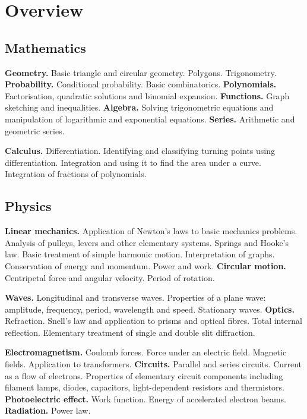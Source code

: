 \documentclass{article}
\date{x/x/20xx}
\begin{document}
\pagestyle{fancy}


\section{Overview}
\subsection{Mathematics}

\textbf{Geometry.} Basic triangle and circular geometry. Polygons. Trigonometry. \textbf{Probability.} Conditional probability. Basic combinatorics. \textbf{Polynomials.} Factorisation, quadratic solutions and binomial expansion. \textbf{Functions.} Graph sketching and inequalities. \textbf{Algebra.} Solving trigonometric equations and manipulation of logarithmic and exponential equations. \textbf{Series.} Arithmetic and geometric series.

\textbf{Calculus.} Differentiation. Identifying and classifying turning points using differentiation. Integration and using it to find the area under a curve. Integration of fractions of polynomials.

\subsection{Physics}

\textbf{Linear mechanics.} Application of Newton's laws to basic mechanics problems. Analysis of pulleys, levers and other elementary systems. Springs and Hooke's law. Basic treatment of simple harmonic motion. Interpretation of graphs. Conservation of energy and momentum. Power and work. \textbf{Circular motion.} Centripetal force and angular velocity. Period of rotation.

\textbf{Waves.} Longitudinal and transverse waves. Properties of a plane wave: amplitude, frequency, period, wavelength and speed. Stationary waves. \textbf{Optics.} Refraction. Snell's law and application to prisms and optical fibres. Total internal reflection. Elementary treatment of single and double slit diffraction.

\textbf{Electromagnetism.} Coulomb forces. Force under an electric field. Magnetic fields. Application to transformers. \textbf{Circuits.} Parallel and series circuits. Current as a flow of electrons. Properties of elementary circuit components including filament lamps, diodes, capacitors, light-dependent resistors and thermistors. \textbf{Photoelectric effect.} Work function. Energy of accelerated electron beams. \textbf{Radiation.} Power law.
\end{document}
